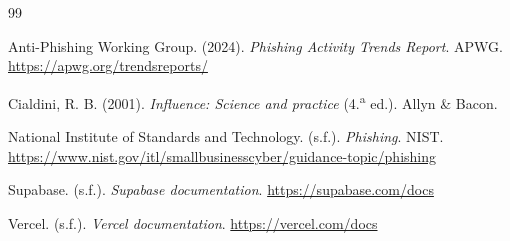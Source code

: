 \documentclass[12pt,a4paper]{article}
\begin{document}
\begin{thebibliography}{99}
\setlength{\itemsep}{0.5em}

Anti-Phishing Working Group. (2024). \textit{Phishing Activity Trends Report}. APWG. \url{https://apwg.org/trendsreports/}

Cialdini, R. B. (2001). \textit{Influence: Science and practice} (4.\textsuperscript{a} ed.). Allyn \& Bacon.

National Institute of Standards and Technology. (s.f.). \textit{Phishing}. NIST. \url{https://www.nist.gov/itl/smallbusinesscyber/guidance-topic/phishing}

Supabase. (s.f.). \textit{Supabase documentation}. \url{https://supabase.com/docs}

Vercel. (s.f.). \textit{Vercel documentation}. \url{https://vercel.com/docs}

\end{thebibliography}
\end{document}
